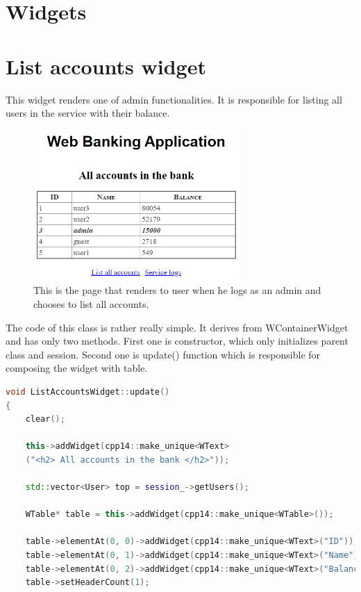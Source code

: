 \documentclass[a4paper,12pt]{book}
\begin{document}
\section{Widgets}
{
\section*{List accounts widget}
{

This widget renders one of admin functionalities. It is responsible for listing all users in the service with their balance. 

\begin{figure}[H]
\centering
\includegraphics[width=0.7\textwidth]{listaccounts}
\caption{This is the page that renders to user when he logs as an admin and chooses to list all accounts.}
\end{figure}  

The code of this class is rather really simple. It derives from WContainerWidget and has only two methods. First one is constructor, which only initializes parent class and session. Second one is update() function which is responsible for composing the widget with table.

\bigskip
\begin{lstlisting}[frame=single, basicstyle=\small, language=C++, caption={ListAccountsWidget::update() function.}, captionpos=b]
void ListAccountsWidget::update()
{
    clear();

    this->addWidget(cpp14::make_unique<WText>
    ("<h2> All accounts in the bank </h2>"));

    std::vector<User> top = session_->getUsers();

    WTable* table = this->addWidget(cpp14::make_unique<WTable>());

    table->elementAt(0, 0)->addWidget(cpp14::make_unique<WText>("ID"));
    table->elementAt(0, 1)->addWidget(cpp14::make_unique<WText>("Name"));
    table->elementAt(0, 2)->addWidget(cpp14::make_unique<WText>("Balance"));
    table->setHeaderCount(1);


\end{lstlisting}}}
\end{document}
